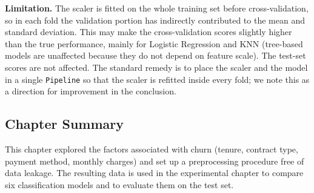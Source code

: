 \textbf{Limitation.} The scaler is fitted on the whole training set before cross-validation, so in each fold the validation portion has indirectly contributed to the mean and standard deviation. This may make the cross-validation scores slightly higher than the true performance, mainly for Logistic Regression and KNN (tree-based models are unaffected because they do not depend on feature scale). The test-set scores are not affected. The standard remedy is to place the scaler and the model in a single \texttt{Pipeline} so that the scaler is refitted inside every fold; we note this as a direction for improvement in the conclusion.

\subsection{Chapter Summary}

This chapter explored the factors associated with churn (tenure, contract type, payment method, monthly charges) and set up a preprocessing procedure free of data leakage. The resulting data is used in the experimental chapter to compare six classification models and to evaluate them on the test set.







